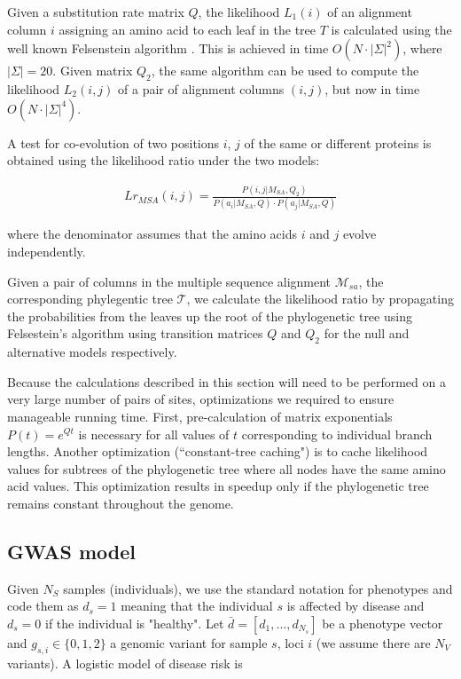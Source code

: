 Given a substitution rate matrix $Q$, the likelihood $L_1(i)$ of an alignment column $i$ assigning an amino acid to each leaf in the tree $T$ is calculated using the well known Felsenstein algorithm \cite{felsenstein2004inferring}. This is achieved in time $O(N \cdot |\Sigma|^2)$, where $|\Sigma|=20$. Given matrix $Q_2$, the same algorithm can be used to compute the likelihood $L_2(i,j)$ of a pair of alignment columns $(i,j)$, but now in time $O(N \cdot |\Sigma|^4)$. 

A test for co-evolution of two positions $i$, $j$ of the same or different proteins is obtained using the likelihood ratio under the two models: 

\begin{eqnarray*}
Lr_{MSA}(i,j) = \frac{P(i, j | M_{SA}, Q_2)}{P(a_i | M_{SA}, Q) \cdot P(a_j | M_{SA}, Q)}
\end{eqnarray*}

where the denominator assumes that the amino acids $i$ and $j$ evolve independently. 

Given a pair of columns in the multiple sequence alignment $\mathcal{M}_{sa}$, the corresponding phylegentic tree $\mathcal{T}$, we calculate the likelihood ratio by propagating the probabilities from the leaves up the root of the phylogenetic tree using Felsestein's algorithm \cite{felsenstein2004inferring} using transition matrices $Q$ and $Q_2$ for the null and alternative models respectively.

Because the calculations described in this section will need to be performed on a very large number of pairs of sites, optimizations we required to ensure manageable running time. First, pre-calculation of  matrix exponentials $P(t) = e^{Qt}$ is necessary for all values of $t$ corresponding to individual branch lengths. Another optimization (“constant-tree caching") is to cache likelihood values for subtrees of the phylogenetic tree where all nodes have the same amino acid values. This optimization results in speedup only if the phylogenetic tree remains constant throughout the genome.

\subsection{GWAS model}

Given $N_S$ samples (individuals), we use the standard notation for phenotypes and code them as $d_s=1$ meaning that the individual $s$ is affected by disease and $d_s=0$ if the individual is "healthy". Let $\bar{d} = [d_1, ..., d_{N_s}]$ be a phenotype vector and $g_{s,i} \in \{0,1,2\}$ a genomic variant for sample $s$, loci $i$ (we assume there are $N_V$ variants). A logistic model of disease risk \cite{balding2006tutorial} is

